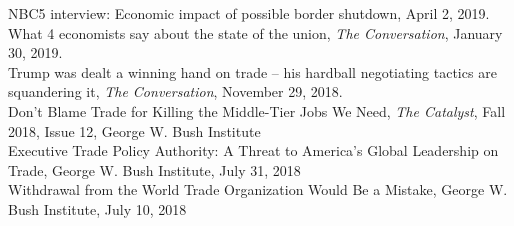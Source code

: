 \documentclass[11pt]{res}
\begin{document}
\begin{resume}
NBC5 interview: Economic impact of possible border shutdown, April 2, 2019.\vspace{1.5mm}\\
What 4 economists say about the state of the union, \emph{The Conversation}, January 30, 2019.\vspace{1.5mm}\\
Trump was dealt a winning hand on trade – his hardball negotiating tactics are squandering it, \emph{The Conversation}, November 29, 2018.\vspace{1.5mm}\\
Don't Blame Trade for Killing the Middle-Tier Jobs We Need, \emph{The Catalyst}, Fall 2018, Issue 12, George W. Bush Institute\vspace{1.5mm}\\
Executive Trade Policy Authority: A Threat to America’s Global Leadership on Trade, George W. Bush Institute, July 31, 2018\vspace{1.5mm}\\
Withdrawal from the World Trade Organization Would Be a Mistake, George W. Bush Institute, July 10, 2018






\end{resume}
\end{document}
